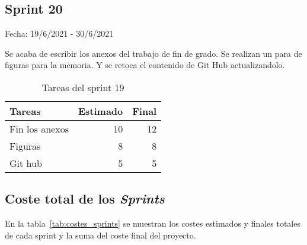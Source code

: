 \subsection{Sprint 20}

    Fecha: 19/6/2021 - 30/6/2021
    
    Se acaba de escribir los anexos del trabajo de fin de grado. Se realizan un para de figuras para la memoria. Y se retoca el contenido de Git Hub actualizandolo.
    \begin{table}[H]
    	 \begin{tabularx}{\linewidth}{X r r}
    	 	\toprule \textbf{Tareas} & \textbf{Estimado} & \textbf{Final}\\
    	 	\toprule
         	Fin los anexos & 10 & 12  \\
         	Figuras  & 8 & 8  \\
            Git hub & 5 & 5  \\
		
    	 	\bottomrule
    	 \end{tabularx}
    	 \caption{Tareas del sprint 19}
    \end{table}

\subsection{Coste total de los \emph{Sprints}}

En la tabla~\ref{tab:costes_sprints} se muestran los costes estimados y finales totales de cada sprint y la suma del coste final del proyecto. 
	

